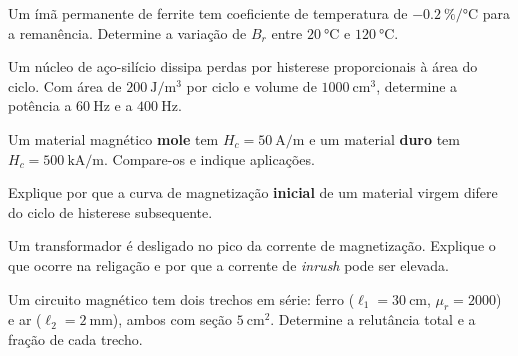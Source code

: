 \begin{questao}[2]{}

Um ímã permanente de ferrite tem coeficiente de temperatura de
$\SI{-0.2}{\percent\per\celsius}$ para a remanência. Determine a variação de
$B_r$ entre $\SI{20}{\celsius}$ e $\SI{120}{\celsius}$.


\end{questao}
\begin{questao}[2]{}

Um núcleo de aço-silício dissipa perdas por histerese proporcionais à área do
ciclo. Com área de $\SI{200}{\joule\per\meter\cubed}$ por ciclo e volume de
$\SI{1000}{\centi\meter\cubed}$, determine a potência a $\SI{60}{\hertz}$ e a
$\SI{400}{\hertz}$.


\end{questao}
\begin{questao}[2]{}

Um material magnético \textbf{mole} tem $H_c=\SI{50}{\ampere\per\meter}$ e um
material \textbf{duro} tem $H_c=\SI{500}{\kilo\ampere\per\meter}$. Compare-os
e indique aplicações.


\end{questao}
\begin{questao}[2]{}

Explique por que a curva de magnetização \textbf{inicial} de um material
virgem difere do ciclo de histerese subsequente.


\end{questao}
\begin{questao}[2]{}

Um transformador é desligado no pico da corrente de magnetização. Explique o
que ocorre na religação e por que a corrente de \emph{inrush} pode ser elevada.


\end{questao}
\begin{questao}[2]{}

Um circuito magnético tem dois trechos em série: ferro
($\ell_1=\SI{30}{\centi\meter}$, $\mu_r=2000$) e ar
($\ell_2=\SI{2}{\milli\meter}$), ambos com seção
$\SI{5}{\centi\meter\squared}$. Determine a relutância total e a fração de cada
trecho.


\end{questao}

